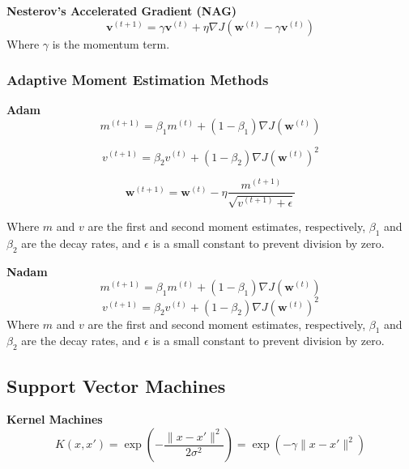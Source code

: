 \documentclass[10pt]{article}
\begin{document}
\begin{multicols}{2}
\textbf{Nesterov's Accelerated Gradient (NAG)}
\begin{equation}
    \mathbf{v}^{(t+1)} = \gamma \mathbf{v}^{(t)} + \eta \nabla J(\mathbf{w}^{(t)} - \gamma \mathbf{v}^{(t)})
\end{equation}
Where $\gamma$ is the momentum term.

\subsubsection*{Adaptive Moment Estimation Methods}

\textbf{Adam}
\begin{equation}
    m^{(t+1)} = \beta_1 m^{(t)} + (1 - \beta_1) \nabla J(\mathbf{w}^{(t)})
\end{equation}

\begin{equation}
    v^{(t+1)} = \beta_2 v^{(t)} + (1 - \beta_2) \nabla J(\mathbf{w}^{(t)})^2
\end{equation}

\begin{equation}
    \mathbf{w}^{(t+1)} = \mathbf{w}^{(t)} - \eta \frac{m^{(t+1)}}{\sqrt{v^{(t+1)} + \epsilon}}
\end{equation}

Where $m$ and $v$ are the first and second moment estimates, respectively, $\beta_1$ and $\beta_2$ are the decay rates, and $\epsilon$ is a small constant to prevent division by zero.

\textbf{Nadam}
\begin{equation}
    m^{(t+1)} = \beta_1 m^{(t)} + (1 - \beta_1) \nabla J(\mathbf{w}^{(t)})
\end{equation}
\begin{equation}
    v^{(t+1)} = \beta_2 v^{(t)} + (1 - \beta_2) \nabla J(\mathbf{w}^{(t)})^2
\end{equation}
Where $m$ and $v$ are the first and second moment estimates, respectively, $\beta_1$ and $\beta_2$ are the decay rates, and $\epsilon$ is a small constant to prevent division by zero.


\subsection*{Support Vector Machines}
\textbf{Kernel Machines}
\begin{equation}
    K(x, x') = \exp(-\frac{\|x - x'\|^2}{2\sigma^2}) = \exp(-\gamma \|x - x'\|^2)
\end{equation}


\end{multicols}
\end{document}
